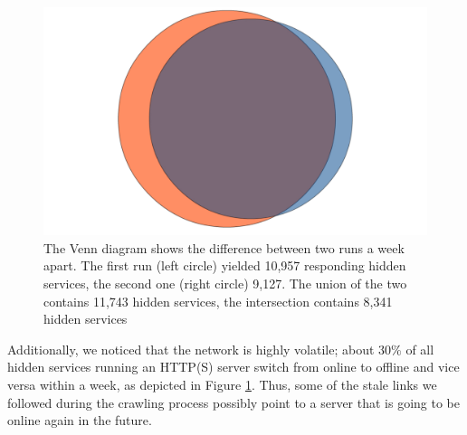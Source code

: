 \fi
\ifdgruyter
  \begin{figure}[H]
      \centering
      \includegraphics[width=0.7\linewidth]{images/DarknetVolatility.png}
      \caption{The Venn diagram shows the difference between two runs a week apart. The first run (left circle) yielded 10,957 responding hidden services, the second one (right circle) 9,127. The union of the two contains 11,743 hidden services, the intersection contains 8,341 hidden services}
      \label{fig:highVolatility}
  \end{figure}
\fi

Additionally, we noticed that the network is highly volatile; about $30\%$ of all hidden services running an HTTP(S) server switch from online to offline and vice versa within a week, as depicted in Figure \ref{fig:highVolatility}.
Thus, some of the stale links we followed during the crawling process possibly point to a server that is going to be online again in the future. 

